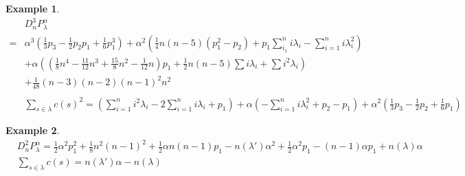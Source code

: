 \documentclass{article}
\newtheorem{example}{Example}[theorem]
\newcommand{\lr}[1]{\left({#1}\right)}
\begin{document}
\begin{example}
\[
\begin{aligned}
&D_n^3P_\lambda^\alpha\\
=& \alpha^3\lr{\frac13 p_3 -\frac12 p_2p_1 + \frac16 p_1^3} + \alpha^2\lr{\frac14 n(n-5)(p_1^2 - p_2) + p_1 \sum_{i_1}^n i\lambda_i - \sum_{i=1}^ni\lambda_i^2}\\
& + \alpha\lr{\lr{\frac18 n^4 - \frac{11}{12}n^3 + \frac{15}{8}n^2 - \frac{1}{12}n}p_1 + \frac12n(n-5)\sum i\lambda_i + \sum i^2\lambda_i}\\
& + \frac{1}{48}(n-3)(n-2)(n-1)^2n^2\\
\\
&\sum_{s\in\lambda}c(s)^2= \lr{\sum_{i=1}^ni^2\lambda_i - 2\sum_{i=1}^n i\lambda_i + p_1} +\alpha\lr{-\sum_{i=1}^n i\lambda_i^2 + p_2 - p_1} + \alpha^2\lr{\frac13p_3 - \frac12p_2 + \frac16p_1}
\end{aligned}
\]
\end{example}

\begin{example}
\[
\begin{aligned}
&D_n^2P_\lambda^\alpha=\frac12\alpha^2p_1^2 + \frac18 n^2(n-1)^2 + \frac12 \alpha n(n-1)p_1 - n(\lambda')\alpha^2 + \frac12 \alpha^2p_1 - (n-1)\alpha p_1 + n(\lambda)\alpha\\
&\sum_{s\in\lambda} c(s)=n(\lambda')\alpha - n(\lambda)
\end{aligned}
\]
\end{example}
\end{document}
